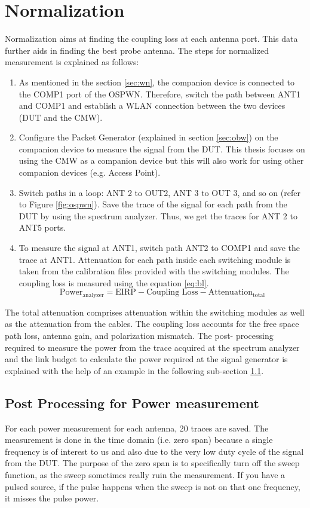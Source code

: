 \section{Normalization}
Normalization aims at finding the coupling loss at each antenna port. This data further aids in finding the best probe antenna. The steps for normalized measurement is explained as follows:
\begin{enumerate}
\item As mentioned in the section \ref{sec:wn}, the companion device is connected to the COMP1 port of the OSPWN. Therefore, switch the path between ANT1 and COMP1 and establish a \acs{WLAN} connection between the two devices (\acs{DUT} and the \acs{CMW}). 
\item Configure the Packet Generator (explained in section \ref{sec:obw}) on the companion device to measure the signal from the \acs{DUT}. This thesis focuses on using the CMW as a companion device but this will also work for using other companion devices (e.g. Access Point).
\item Switch paths in a loop: ANT 2 to OUT2, ANT 3 to OUT 3, and so on (refer to Figure \ref{fig:ospwn}). Save the trace of the signal for each path from the \acs{DUT} by using the spectrum analyzer. Thus, we get the traces for ANT 2 to ANT5 ports.
\item To measure the signal at ANT1, switch path ANT2 to COMP1 and save the trace at ANT1. Attenuation for each path inside each switching module is taken from the calibration files provided with the switching modules. The coupling loss is measured using the equation \ref{eq:bl}.
\begin{equation}
\mbox{Power}_{\mbox{analyzer}}  = \mbox{EIRP} - \mbox{Coupling Loss} - \mbox{Attenuation}_{\mbox{total}}  \label{eq:bl}
\end{equation}
\end{enumerate}
The total attenuation comprises attenuation within the switching modules as well as the attenuation from the cables. The coupling loss accounts for the free space path loss, antenna gain, and polarization mismatch. The post- processing required to measure the power from the trace acquired at the spectrum analyzer and the link budget to calculate the power required at the signal generator is explained with the help of an example in the following sub-section \ref{sec:abc}.

\subsection{Post Processing for Power measurement} \label{sec:abc}
For each power measurement for each antenna, 20 traces are saved. The measurement is done in the time domain (i.e. zero span) because a single frequency is of interest to us and also due to the very low duty cycle of the signal from the \acs{DUT}. The purpose of the zero span is to specifically turn off the sweep function, as the sweep sometimes really ruin the measurement. If you have a pulsed source, if the pulse happens when the sweep is not on that one frequency, it misses the pulse power.\\

